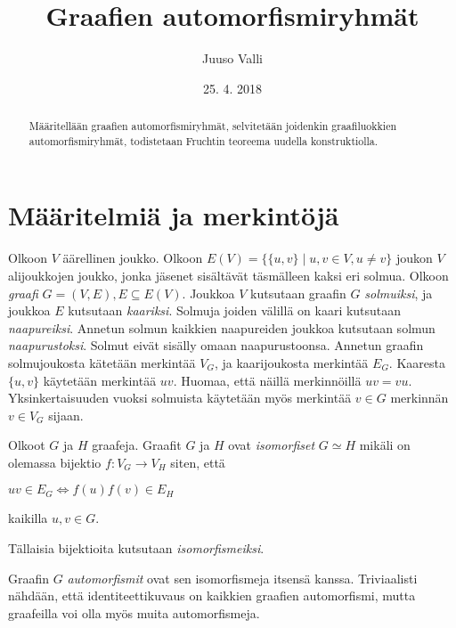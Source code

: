 \documentclass[a4paper, 12pt]{article}
\theoremstyle{definition}
\theoremstyle{plain}
\begin{document}
\title{Graafien automorfismiryhmät}
\author{Juuso Valli}
\date{25. 4. 2018}

\maketitle

\begin{abstract}
Määritellään graafien automorfismiryhmät, selvitetään joidenkin graafiluokkien automorfismiryhmät, todistetaan Fruchtin teoreema uudella konstruktiolla.
\end{abstract}

\tableofcontents

\newpage

\section{Määritelmiä ja merkintöjä}

Olkoon $V$ äärellinen joukko. Olkoon $E(V) = \{\{u, v\}\;|\;u, v \in V, u \neq v\}$ joukon $V$ alijoukkojen joukko, jonka jäsenet sisältävät täsmälleen kaksi eri solmua.
Olkoon \emph{graafi} $G = (V, E), E \subseteq E(V)$. Joukkoa $V$ kutsutaan graafin $G$ \emph{solmuiksi}, ja joukkoa $E$ kutsutaan \emph{kaariksi}. Solmuja joiden välillä on kaari kutsutaan \emph{naapureiksi}. Annetun solmun kaikkien naapureiden joukkoa kutsutaan solmun \emph{naapurustoksi}. Solmut eivät sisälly omaan naapurustoonsa. Annetun graafin solmujoukosta kätetään merkintää $V_G$, ja kaarijoukosta merkintää $E_G$.
Kaaresta $\{u, v\}$ käytetään merkintää $uv$. Huomaa, että näillä merkinnöillä $uv = vu$.
Yksinkertaisuuden vuoksi solmuista käytetään myös merkintää $v \in G$ merkinnän $v \in V_G$ sijaan.

Olkoot $G$ ja $H$ graafeja. Graafit $G$ ja $H$ ovat \emph{isomorfiset} $G \simeq H$ mikäli on olemassa bijektio $f: V_G \rightarrow V_H$ siten, että
\begin{center}
\begin{math}
uv \in E_G \Longleftrightarrow f(u)f(v) \in E_H
\end{math}
\end{center}
kaikilla $u, v \in G$.

Tällaisia bijektioita kutsutaan \emph{isomorfismeiksi}.

Graafin $G$ \emph{automorfismit} ovat sen isomorfismeja itsensä kanssa. Triviaalisti nähdään, että identiteettikuvaus on kaikkien graafien automorfismi, mutta graafeilla voi olla myös muita automorfismeja.
\end{document}
